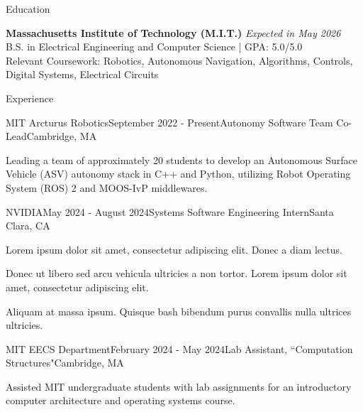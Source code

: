 \documentclass[
	10pt,
]{resume}
\begin{document}
\begin{rSection}{Education}
	
	\textbf{Massachusetts Institute of Technology (M.I.T.)} \hfill \textit{Expected in May 2026} \\ 
	B.S. in Electrical Engineering and Computer Science | GPA: 5.0/5.0 \\
    Relevant Coursework: Robotics, Autonomous Navigation, Algorithms, Controls, Digital Systems, Electrical Circuits
	
\end{rSection}

\begin{rSection}{Experience}

	\begin{rSubsection}{MIT Arcturus Robotics}{September 2022 - Present}{Autonomy Software Team Co-Lead}{Cambridge, MA}
    \item Leading a team of approximately 20 students to develop an Autonomous Surface Vehicle (ASV) autonomy stack in C++ and Python, utilizing Robot Operating System (ROS) 2 and MOOS-IvP middlewares.
    \item 
    \item 
	\end{rSubsection}

	\begin{rSubsection}{NVIDIA}{May 2024 - August 2024}{Systems Software Engineering Intern}{Santa Clara, CA}
    \item Lorem ipsum dolor sit amet, consectetur adipiscing elit. Donec a diam lectus.
    \item Donec ut libero sed arcu vehicula ultricies a non tortor. Lorem ipsum dolor sit amet, consectetur adipiscing elit.
    \item Aliquam at massa ipsum. Quisque bash bibendum purus convallis nulla ultrices ultricies.
	\end{rSubsection}

	\begin{rSubsection}{MIT EECS Department}{February 2024 - May 2024}{Lab Assistant, ``Computation Structures"}{Cambridge, MA}
    \item Assisted MIT undergraduate students with lab assignments for an introductory computer architecture and operating systems course.
	\end{rSubsection}


\end{rSection}
\end{document}
